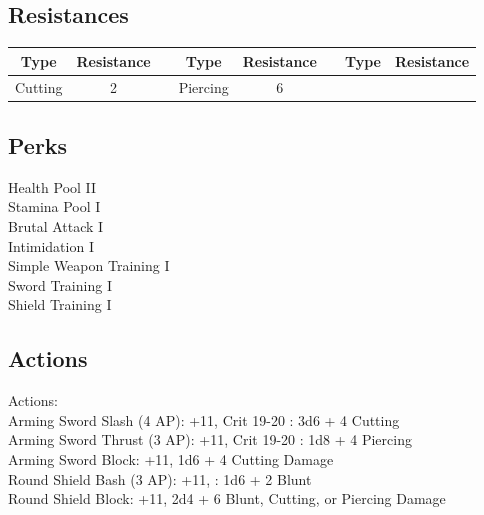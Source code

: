 \subsection{Resistances}
\begin{minipage}[H]{1\textwidth}
    \centering
    \begin{tabular}[c]{|c | c | c | c | c | c | c | c|}
        \hline
        Type & Resistance && Type & Resistance && Type & Resistance\\
        \hline
        Cutting & 2 &&
        Piercing & 6\\
        \hline
    \end{tabular}
\end{minipage}

\subsection{Perks}
Health Pool II\\
Stamina Pool I\\
Brutal Attack I\\
Intimidation I\\
Simple Weapon Training I\\
Sword Training I\\
Shield Training I\\

\subsection{Actions}
Actions:\\
Arming Sword Slash (4 AP): +11, Crit 19-20 : 3d6 + 4 Cutting\\

Arming Sword Thrust (3 AP): +11, Crit 19-20 : 1d8 + 4 Piercing\\

Arming Sword Block: +11, 1d6 + 4 Cutting Damage\\

Round Shield Bash (3 AP): +11, : 1d6 + 2 Blunt\\

Round Shield Block: +11, 2d4 + 6 Blunt, Cutting, or Piercing Damage\\


